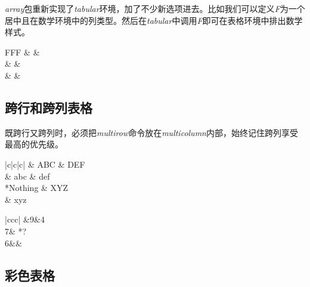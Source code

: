 \emph{array}包重新实现了\emph{tabular}环境，加了不少新选项进去。比如我们可以定义\emph{F}为一个居中且在数学环境中的列类型。然后在\emph{tabular}中调用\emph{F}即可在表格环境中排出数学样式。

\begin{codeshow}
\centering
{}
\begin{tabular}{FFF}
    \alpha & \beta    & \gamma   \\
    \delta & \epsilon & \upsilon \\
    \sigma & \tau     & \phi     \\
\end{tabular}
\end{codeshow}

\subsection{跨行和跨列表格}

既跨行又跨列时，必须把\emph{multirow}命令放在\emph{multicolumn}内部，始终记住跨列享受最高的优先级。

\begin{codeshow}
\centering
\begin{center}
    \begin{tabular}{|c|c|c|}
        \hline
        & ABC & DEF \\
         & abc & def \\
        \hline
        {*{Nothing}} & XYZ \\
         & xyz \\
        \hline
    \end{tabular}
\end{center}
\end{codeshow}

\begin{codeshow}
    \centering
    \begin{tabular}{|ccc|}
        &9&4\\
        7&
            {*{{?}}}\\
        6&&\\
        \hline
    \end{tabular}
\end{codeshow}

\subsection{彩色表格}

